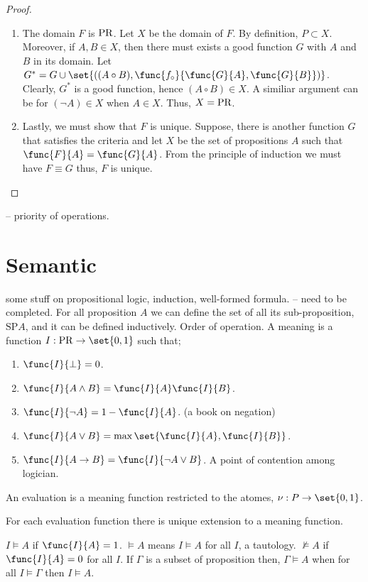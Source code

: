\begin{proof}
\begin{enumerate}
        \item The domain \(F\) is \(\operatorname{PR}\). Let \(X\) be the domain of \(F\). By definition, \(P \subset X\). Moreover, if \(A,B \in X\), then there must exists a good function \(G\) with \(A\) and \(B\) in its domain. Let \(G^{\ast} = G \cup \set{((A \circ B), \func{f_{\circ}}{\func{G}{A}, \func{G}{B}})}\). Clearly, \(G^{\ast}\) is a good function, hence \((A \circ B) \in X\). A similiar argument can be for \((\neg A) \in X\) when \(A \in X\). Thus, \(X = \operatorname{PR}\).
        \item Lastly, we must show that \(F\) is unique.  Suppose, there is another function \(G\) that satisfies the criteria and let \(X\) be the set of propositions \(A\) such that \(\func{F}{A} = \func{G}{A}\). From the principle of induction we must have \(F \equiv G\) thus, \(F\) is unique.
    \end{enumerate}
\end{proof}
-- priority of operations.

\section{Semantic}


some stuff on propositional logic, induction, well-formed formula. -- need to be completed.
For all proposition \(A\) we can define the set of all its sub-proposition, \(\mathrm{SP} {A}\), and it can be defined inductively. Order of operation. A meaning is a function \(I : \mathrm{PR} \to \set{0,1}\) such that;
\begin{enumerate}
    \item \(\func{I}{\perp} = 0 \).
    \item \(\func{I}{A \land B} = \func{I}{A} \func{I}{B}\).
    \item \(\func{I}{\neg A} = 1 - \func{I}{A}\). (a book on negation)
    \item \(\func{I}{A \lor B} = \max \set{\func{I}{A}, \func{I}{B}}\).
    \item \(\func{I}{A \to B} = \func{I}{\neg A \lor B}\). A point of contention among logician.
\end{enumerate}
An evaluation is a meaning function restricted to the atomes, \(\nu : P \to \set{0,1}\).

\begin{theorem}
    For each evaluation function there is unique extension to a meaning function.
\end{theorem}

\(I \models A\) if \(\func{I}{A} = 1\). \(\models A\) means \(I \models A\) for all \(I\), a tautology. \(\not\models A\) if \(\func{I}{A} = 0\) for all \(I\). If \(\Gamma\) is a subset of proposition then, \(\Gamma \models A\) when for all \(I \models \Gamma\) then \(I \models A\).


